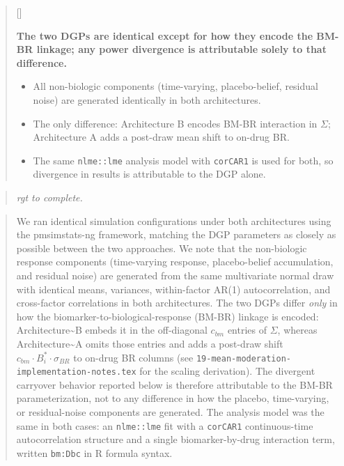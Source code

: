\documentclass[
  11pt,
]{article}
\newcounter{pgraph}
\newenvironment{bullets}{%
  \stepcounter{pgraph}%
  \begin{quote}\small\sffamily\color[gray]{0.30}%
  {\normalfont\scriptsize\color[gray]{0.58}[\thepgraph]\enspace}}{%
  \end{quote}}
\newenvironment{rgt}{%
  \begin{quote}\small\itshape\color[RGB]{20,60,160}}{%
  \end{quote}}
\newenvironment{orig}{%
  \begin{quote}\normalsize\color[gray]{0.55}}{%
  \end{quote}}
\begin{document}
\begin{bullets}

\textbf{The two DGPs are identical except for how they encode
the BM-BR linkage; any power divergence is attributable solely
to that difference.}

\begin{itemize}\setlength{\itemsep}{2pt}\setlength{\parskip}{0pt}
\item All non-biologic components (time-varying, placebo-belief,
  residual noise) are generated identically in both
  architectures.
\item The only difference: Architecture B encodes BM-BR
  interaction in $\Sigma$; Architecture A adds a post-draw
  mean shift to on-drug BR.
\item The same \texttt{nlme::lme} analysis model with
  \texttt{corCAR1} is used for both, so divergence in results
  is attributable to the DGP alone.
\end{itemize}

\end{bullets}

\begin{rgt}
rgt to complete.

\end{rgt}

\begin{orig}
We ran identical simulation configurations under both architectures
using the pmsimstats-ng framework, matching the DGP parameters as
closely as possible between the two approaches. We note that the
non-biologic response components (time-varying response, placebo-belief
accumulation, and residual noise) are generated from the same
multivariate normal draw with identical means, variances, within-factor
AR(1) autocorrelation, and cross-factor correlations in both
architectures. The two DGPs differ \emph{only} in how the
biomarker-to-biological-response (BM-BR) linkage is encoded:
Architecture\textasciitilde B embeds it in the off-diagonal \(c_{bm}\)
entries of \(\Sigma\), whereas Architecture\textasciitilde A omits those
entries and adds a post-draw shift
\(c_{bm} \cdot B_i^{*} \cdot \sigma_{BR}\) to on-drug BR columns (see
\texttt{19-mean-moderation-implementation-notes.tex} for the scaling
derivation). The divergent carryover behavior reported below is
therefore attributable to the BM-BR parameterization, not to any
difference in how the placebo, time-varying, or residual-noise
components are generated. The analysis model was the same in both cases:
an \texttt{nlme::lme} fit with a \texttt{corCAR1} continuous-time
autocorrelation structure and a single biomarker-by-drug interaction
term, written \texttt{bm:Dbc} in R formula syntax.

\end{orig}
\end{document}
